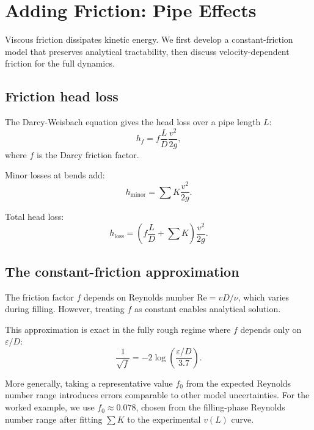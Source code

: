 \documentclass[11pt]{article}
\begin{document}
\section{Adding Friction: Pipe Effects}
\label{sec:friction}

Viscous friction dissipates kinetic energy. We first develop a constant-friction model that preserves analytical tractability, then discuss velocity-dependent friction for the full dynamics.

\subsection{Friction head loss}

The Darcy-Weisbach equation gives the head loss over a pipe length $L$:
\begin{equation}
  h_f = f \frac{L}{D} \frac{v^2}{2g},
  \label{eq:darcy-weisbach}
\end{equation}
where $f$ is the Darcy friction factor.

Minor losses at bends add:
\begin{equation}
  h_{\text{minor}} = \sum K \frac{v^2}{2g}.
  \label{eq:minor-loss}
\end{equation}

Total head loss:
\begin{equation}
  h_{\text{loss}} = \left(f\frac{L}{D} + \sum K\right) \frac{v^2}{2g}.
  \label{eq:total-loss}
\end{equation}

\subsection{The constant-friction approximation}

The friction factor $f$ depends on Reynolds number $\text{Re} = vD/\nu$, which varies during filling. However, treating $f$ as constant enables analytical solution.

This approximation is exact in the fully rough regime where $f$ depends only on $\varepsilon/D$:
\begin{equation}
  \frac{1}{\sqrt{f}} = -2\log\left(\frac{\varepsilon/D}{3.7}\right).
  \label{eq:fully-rough}
\end{equation}

More generally, taking a representative value $f_0$ from the expected Reynolds number range introduces errors comparable to other model uncertainties. For the worked example, we use $f_0 \approx 0.078$, chosen from the filling-phase Reynolds number range after fitting $\sum K$ to the experimental $v(L)$ curve.
\end{document}

